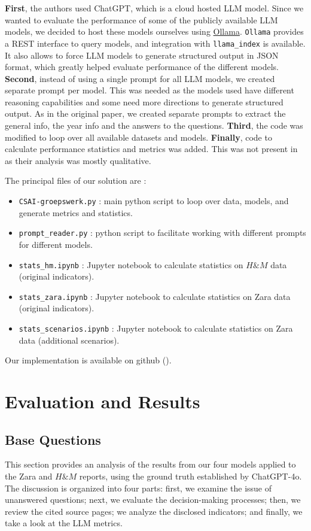 \documentclass[]{article}
\begin{document}
\textbf{First}, the authors used ChatGPT, which is a cloud hosted LLM model.
Since we wanted to evaluate the performance of some of the publicly available LLM models, we decided to host these models ourselves using \href{https://ollama.com/}{Ollama}.
\texttt{Ollama} provides a REST interface to query models, and integration with \texttt{llama\_index} is available.
It also allows to force LLM models to generate structured output in JSON format, which greatly helped evaluate performance of the different models.
\textbf{Second}, instead of using a single prompt for all LLM models, we created separate prompt per model.
This was needed as the models used have different reasoning capabilities and some need more directions to generate structured output.
As in the original paper, we created separate prompts to extract the general info, the year info and the answers to the questions.
\textbf{Third}, the code was modified to loop over all available datasets and models.
\textbf{Finally}, code to calculate performance statistics and metrics was added.
This was not present in \cite{durability} as their analysis was mostly qualitative.

The principal files of our solution are :

\begin{itemize}
    \item \texttt{CSAI-groepswerk.py} : main python script to loop over data, models, and generate metrics and statistics.
    \item \texttt{prompt\_reader.py} : python script to facilitate working with different prompts for different models.
    \item \texttt{stats\_hm.ipynb} : Jupyter notebook to calculate statistics on $H\&M$ data (original indicators).
    \item \texttt{stats\_zara.ipynb} : Jupyter notebook to calculate statistics on Zara data (original indicators).
    \item \texttt{stats\_scenarios.ipynb} : Jupyter notebook to calculate statistics on Zara data (additional scenarios).
\end{itemize}

Our implementation is available on github (\cite{github}).

\section{Evaluation and Results} \label{sec:evaluation}
\subsection{Base Questions}
This section provides an analysis of the results from our four models applied to the Zara and $H\&M$ reports, using the ground truth established by ChatGPT-4o.
The discussion is organized into four parts: first, we examine the issue of unanswered questions; 
next, we evaluate the decision-making processes; then, we review the cited source pages; 
we analyze the disclosed indicators; and finally, we take a look at the LLM metrics.
\end{document}
